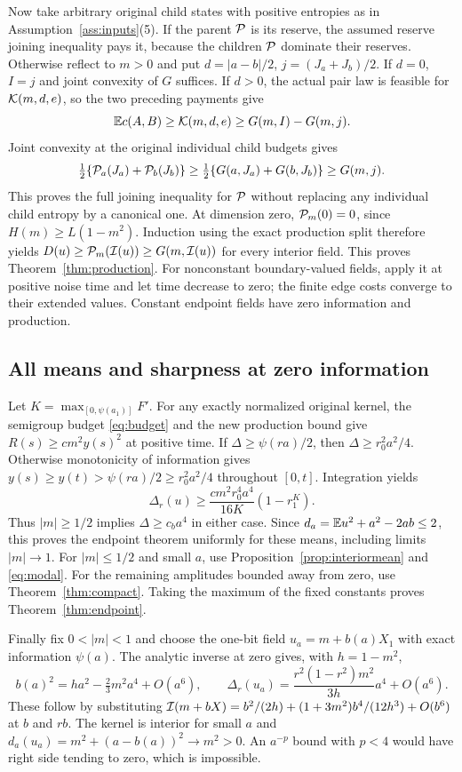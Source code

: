 Now take arbitrary original child states with positive entropies as in
Assumption~\ref{ass:inputs}(5). If the parent $\mathcal P$ is its reserve,
the assumed reserve joining inequality pays it, because the children
$\mathcal P$ dominate their reserves. Otherwise reflect to $m>0$ and put
$d=|a-b|/2$, $j=(J_a+J_b)/2$. If $d=0$, $I=j$ and joint convexity
of $G$ suffices. If $d>0$, the actual pair law is feasible for
$\mathcal K(m,d,e)$, so the two preceding payments give
\[
 \mathbb E c(A,B)\ge\mathcal K(m,d,e)\ge G(m,I)-G(m,j).
\]
Joint convexity at the original individual child budgets gives
\[
 \tfrac12\{\mathcal P_a(J_a)+\mathcal P_b(J_b)\}
 \ge\tfrac12\{G(a,J_a)+G(b,J_b)\}\ge G(m,j).
\]
This proves the full joining inequality for $\mathcal P$ without replacing
any individual child entropy by a canonical one.
At dimension zero, $\mathcal P_m(0)=0$, since $H(m)\ge L(1-m^2)$.
Induction using the exact production split therefore yields
$D(u)\ge\mathcal P_m(\mathcal I(u))\ge G(m,\mathcal I(u))$ for every interior field.
This proves Theorem~\ref{thm:production}. For nonconstant boundary-valued
fields, apply it at positive noise time and let time decrease to zero;
the finite edge costs converge to their extended values. Constant endpoint
fields have zero information and production.

\subsection{All means and sharpness at zero information}
Let $K=\max_{[0,\psi(a_1)]}F'$. For any exactly normalized original
kernel, the semigroup budget \eqref{eq:budget} and the new production
bound give $R(s)\ge cm^2y(s)^2$ at positive time.
If $\Delta\ge\psi(ra)/2$, then $\Delta\ge r_0^2a^2/4$.
Otherwise monotonicity of information gives
$y(s)\ge y(t)>\psi(ra)/2\ge r_0^2a^2/4$ throughout $[0,t]$.
Integration yields
\begin{equation}\label{eq:uniformbias}
 \Delta_r(u)\ge\frac{c m^2r_0^4a^4}{16K}(1-r_1^K).
\end{equation}
Thus $|m|\ge1/2$ implies $\Delta\ge c_ba^4$ in either case.
Since $d_a=\mathbb E u^2+a^2-2ab\le2$, this proves the endpoint theorem
uniformly for these means, including limits $|m|\to1$.
For $|m|\le1/2$ and small $a$, use
Proposition~\ref{prop:interiormean} and \eqref{eq:modal}.
For the remaining amplitudes bounded away from zero, use
Theorem~\ref{thm:compact}. Taking the maximum of the fixed constants
proves Theorem~\ref{thm:endpoint}.

Finally fix $0<|m|<1$ and choose the one-bit field
$u_a=m+b(a)X_1$ with exact information $\psi(a)$.
The analytic inverse at zero gives, with $h=1-m^2$,
\[
 b(a)^2=ha^2-\tfrac23m^2a^4+O(a^6),\qquad
 \Delta_r(u_a)=\frac{r^2(1-r^2)m^2}{3h}a^4+O(a^6).
\]
These follow by substituting
$\mathcal I(m+bX)=b^2/(2h)+(1+3m^2)b^4/(12h^3)+O(b^6)$
at $b$ and $rb$. The kernel is interior for small $a$ and
$d_a(u_a)=m^2+(a-b(a))^2\to m^2>0$.
An $a^{-p}$ bound with $p<4$ would have right side tending to zero,
which is impossible.
